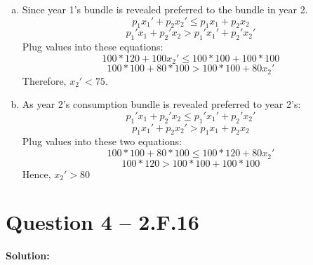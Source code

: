 \documentclass[11pt]{article} %
\begin{document}
\begin{enumerate}[(a)]
        \item Since year 1's bundle is revealed preferred to the bundle in year 2.
            \begin{equation}
                p_1x_1'+p_2x_2'\leq  p_1x_1+p_2x_2
            \end{equation}
            \begin{equation}
                p_1'x_1+p_2'x_2>p_1'x_1'+p_2'x_2'
            \end{equation}
        Plug values into these equations:
            \begin{equation*}
                100*120+100x_2'\leq 100*100+100*100
            \end{equation*}
            \begin{equation*}
                100*100+80*100>100*100+80x_2'
            \end{equation*}
    Therefore, $x_2' <75$.
        \item As year 2's consumption bundle is revealed preferred to year 2's:
            \begin{equation}
                p_1'x_1+p_2'x_2\leq p_1'x_1'+p_2'x_2'
            \end{equation}
            \begin{equation}
                p_1x_1'+p_2x_2'>p_1x_1+p_2x_2
            \end{equation}
            Plug values into these two equations:
            \begin{equation*}
                100*100+80*100\leq 100*120+80x_2'
            \end{equation*}
            \begin{equation*}
                100*120>100*100+100*100
            \end{equation*}
    Hence, $x_2'>80$
\end{enumerate}


\section{Question 4 -- 2.F.16}
\textbf{Solution:}
\end{document}
